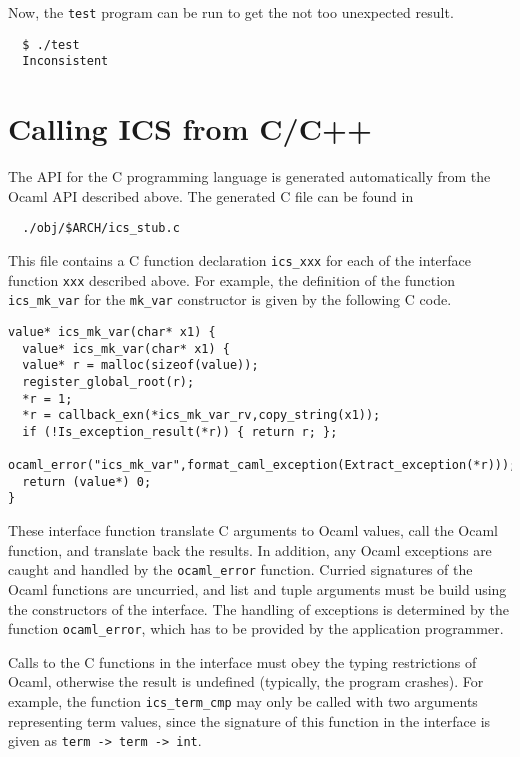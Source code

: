 \documentclass[12pt]{article}
\begin{document}
Now, the {\tt test} program can be run to get the not too unexpected result.
  \begin{verbatim}
  $ ./test 
  Inconsistent
  \end{verbatim}


\section{Calling ICS from C/C++}

The API for the C programming language is generated automatically
from the Ocaml API described above. The generated C file can be found in
  \begin{verbatim}
  ./obj/$ARCH/ics_stub.c
  \end{verbatim}
This file contains a C function declaration \texttt{ics\_xxx} for each of the interface
function \texttt{xxx} described above.  For example, the definition of
the function \texttt{ics\_mk\_var} for the \texttt{mk\_var} constructor is
given by the following C code.
  \begin{verbatim}
value* ics_mk_var(char* x1) {
  value* ics_mk_var(char* x1) {
  value* r = malloc(sizeof(value));
  register_global_root(r);
  *r = 1;
  *r = callback_exn(*ics_mk_var_rv,copy_string(x1));
  if (!Is_exception_result(*r)) { return r; };
  ocaml_error("ics_mk_var",format_caml_exception(Extract_exception(*r)));
  return (value*) 0;
}
 \end{verbatim}
These interface function translate C arguments to Ocaml values, call the
Ocaml function, and translate back the results. In addition, any Ocaml
exceptions are caught and handled by the \texttt{ocaml\_error} function.
Curried signatures of the Ocaml functions are uncurried, and list and
tuple arguments must be build using the constructors of the interface.
The handling of exceptions is determined by the function
\texttt{ocaml\_error}, which has to be provided by the application
programmer.

Calls to the C functions in the interface must obey the typing 
restrictions of Ocaml, otherwise the result is undefined (typically,
the program crashes). For example, the function {\tt ics\_term\_cmp}
may only be called with two arguments representing term values, since
the signature of this function in the interface is given as 
{\tt term -> term -> int}\@.
\end{document}
